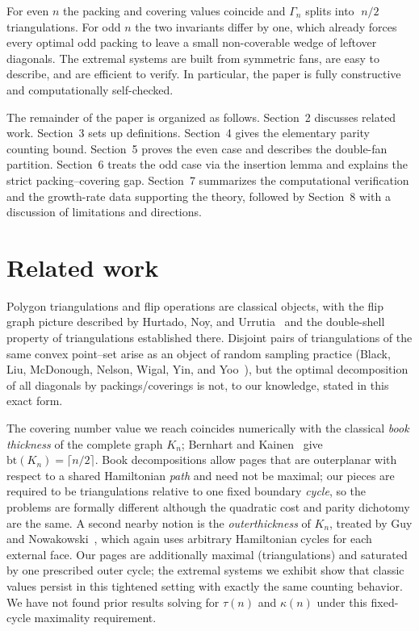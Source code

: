 \documentclass[11pt,a4paper]{article}
\begin{document}
For even $n$ the packing and covering values coincide and $\Gamma_n$ splits into
$\;n/2\;$ triangulations. For odd $n$ the two invariants differ by one, which
already forces every optimal odd packing to leave a small non-coverable wedge
of leftover diagonals. The extremal systems are built from symmetric fans, are
easy to describe, and are efficient to verify. In particular, the paper is
fully constructive and computationally self-checked.

The remainder of the paper is organized as follows. Section~2 discusses related
work. Section~3 sets up definitions. Section~4 gives the elementary parity
counting bound. Section~5 proves the even case and describes the double-fan
partition. Section~6 treats the odd case via the insertion lemma and explains
the strict packing--covering gap. Section~7 summarizes the computational
verification and the growth-rate data supporting the theory, followed by
Section~8 with a discussion of limitations and directions.

\section{Related work}

Polygon triangulations and flip operations are classical objects, with the flip
graph picture described by Hurtado, Noy, and Urrutia~\cite{HKU} and the
double-shell property of triangulations established there. Disjoint pairs of
triangulations of the same convex point--set arise as an object of random
sampling practice (Black, Liu, McDonough, Nelson, Wigal, Yin, and
Yoo~\cite{BLMNWYY}), but the optimal decomposition of all diagonals by
packings/coverings is not, to our knowledge, stated in this exact form.

The covering number value we reach coincides numerically with the classical
\emph{book thickness} of the complete graph $K_n$;
Bernhart and Kainen~\cite{BK79} give $\mathrm{bt}(K_n)=\lceil n/2\rceil$.
Book decompositions allow pages that are outerplanar with respect to a shared
Hamiltonian \emph{path} and need not be maximal; our pieces are required to be
triangulations relative to one fixed boundary \emph{cycle}, so the problems are
formally different although the quadratic cost and parity dichotomy are the
same. A second nearby notion is the \emph{outerthickness} of $K_n$, treated by
Guy and Nowakowski~\cite{GN90}, which again uses arbitrary Hamiltonian cycles
for each external face. Our pages are additionally maximal (triangulations) and
saturated by one prescribed outer cycle; the extremal systems we exhibit show
that classic values persist in this tightened setting with exactly the same
counting behavior. We have not found prior results solving for $\tau(n)$ and
$\kappa(n)$ under this fixed-cycle maximality requirement.
\end{document}
